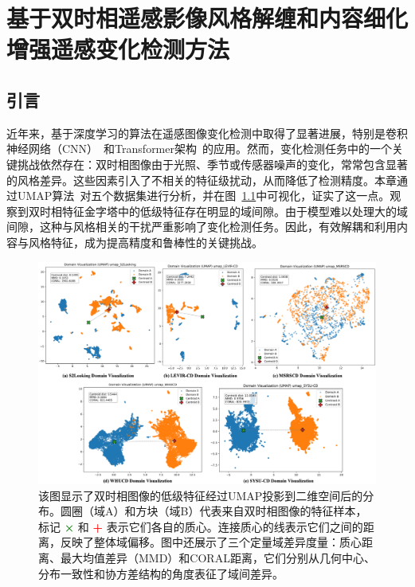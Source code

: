 
\chapter{基于双时相遥感影像风格解缠和内容细化增强遥感变化检测方法}
\section{引言}
近年来，基于深度学习的算法在遥感图像变化检测中取得了显著进展，特别是卷积神经网络（CNN）~\cite{Chen2020DASNetDA,Fang2021SNUNetCDAD}和Transformer架构~\cite{chen_remote_2022,zhang_swinsunet_2022}的应用。然而，变化检测任务中的一个关键挑战依然存在：双时相图像由于光照、季节或传感器噪声的变化，常常包含显著的风格差异。这些因素引入了不相关的特征级扰动，从而降低了检测精度。本章通过UMAP算法~\cite{McInnes2018UMAPUM}对五个数据集进行分析，并在图~\ref{fig:domain_vis}中可视化，证实了这一点。观察到双时相特征金字塔中的低级特征存在明显的域间隙。由于模型难以处理大的域间隙，这种与风格相关的干扰严重影响了变化检测任务。因此，有效解耦和利用内容与风格特征，成为提高精度和鲁棒性的关键挑战。


\begin{figure}[!htbp]
	\centering
	\includegraphics[width=\textwidth]{paper_figures/基于双时相遥感影像风格解缠和内容细化增强遥感变化检测方法/domain_vis.png}
	\caption{该图显示了双时相图像的低级特征经过UMAP投影到二维空间后的分布。圆圈（域A）和方块（域B）代表来自双时相图像的特征样本，标记 \textcolor{green}{\textbf{×}} 和 \textcolor{red}{\textbf{+}} 表示它们各自的质心。连接质心的线表示它们之间的距离，反映了整体域偏移。图中还展示了三个定量域差异度量：质心距离、最大均值差异（MMD）和CORAL距离，它们分别从几何中心、分布一致性和协方差结构的角度表征了域间差异。}
	\label{fig:domain_vis}
\end{figure}



